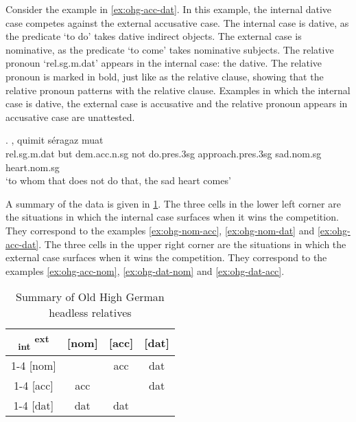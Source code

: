 Consider the example in \ref{ex:ohg-acc-dat}. In this example, the internal dative case competes against the external accusative case.
The internal case is dative, as the predicate  `to do' takes dative indirect objects.
The external case is nominative, as the predicate  `to come' takes nominative subjects.
The relative pronoun  `\ac{rel}.\ac{sg}.\ac{m}.\ac{dat}' appears in the internal case: the dative. The relative pronoun is marked in bold, just like as the relative clause, showing that the relative pronoun patterns with the relative clause.
Examples in which the internal case is dative, the external case is accusative and the relative pronoun appears in accusative case are unattested.

\exg.     , quimit séragaz muat\\
\ac{rel}.\ac{sg}.\ac{m}.\ac{dat} but \ac{dem}.\ac{acc}.\ac{n}.\ac{sg} not do.\ac{pres}.3\ac{sg}\scsub{[dat]} approach.\ac{pres}.3\ac{sg}\scsub{[acc]} sad.\ac{nom}.\ac{sg} heart.\ac{nom}.\ac{sg}\\
`to whom that does not do that, the sad heart comes' \label{ex:ohg-acc-dat}


A summary of the data is given in \ref{tbl:summary-old-high-german}.
The three cells in the lower left corner are the situations in which the internal case surfaces when it wins the competition. They correspond to the examples \ref{ex:ohg-nom-acc}, \ref{ex:ohg-nom-dat} and \ref{ex:ohg-acc-dat}.
The three cells in the upper right corner are the situations in which the external case surfaces when it wins the competition. They correspond to the examples \ref{ex:ohg-acc-nom}, \ref{ex:ohg-dat-nom} and \ref{ex:ohg-dat-acc}.

\begin{table}[ht]
  \center
  \caption{Summary of Old High German headless relatives}
  \begin{tabular}{c|c|c|c}
    \toprule
        \textsubscript{\ac{int}} \textsuperscript{\ac{ext}}
          & [\ac{nom}]
          & [\ac{acc}]
          & [\ac{dat}]
          \\ \cmidrule{1-4}
      [\ac{nom}]
          &
          & \ac{acc}
          & \ac{dat}
          \\ \cmidrule{1-4}
      [\ac{acc}]
          & \ac{acc}
          &
          & \ac{dat}
          \\ \cmidrule{1-4}
      [\ac{dat}]
          & \ac{dat}
          & \ac{dat}
          &
          \\
    \bottomrule
  \end{tabular}
    \label{tbl:summary-old-high-german}
\end{table}

